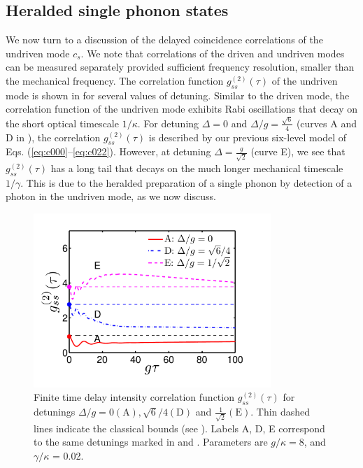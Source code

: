 



\subsection{Heralded single phonon states}

We now turn to a discussion of the delayed coincidence
correlations of the undriven mode $c_s$.
We note that correlations of the driven
and undriven modes can be measured separately
provided sufficient frequency resolution, smaller than
  the mechanical frequency.
The correlation function
$g^{(2)}_{ss}(\tau)$
of the undriven mode
is shown in  for several
values of detuning.
Similar to the driven mode, the
correlation function of the undriven mode
exhibits Rabi oscillations 
that decay on the short optical
timescale
$1/\kappa$.
For detuning $\Delta = 0$ and 
$\Delta/g = \frac{\sqrt{6}}{4}$
(curves A and D in ),
the correlation $g^{(2)}_{ss}(\tau)$
is described by
our previous six-level 
model of Eqs. (\ref{eq:c000}--\ref{eq:c022}).
However,  at detuning $\Delta = \frac{g}{\sqrt{2}}$
(curve E), we see that
$g^{(2)}_{ss}(\tau)$ has a long
tail that decays
on the much longer mechanical timescale $1/\gamma$.
This is due to the heralded preparation
of a single phonon by detection of a photon in the
undriven mode, as we now discuss.
\begin{figure}[htb] \centering
  \includegraphics[width=0.8\textwidth]{./figs_Komar2013/fig6.pdf}
  \caption[Autocorrelation of mode $s$]
  { 
  \label{fig:g2sstau}
  Finite time delay intensity correlation function $g^{(2)}_{ss}(\tau)$
  for detunings $\Delta/g = 0 \mathrm{ (A)}, \sqrt{6}/4 \mathrm{ (D)}$
  and
  $\frac{1}{\sqrt{2}} \mathrm{ (E)}$.
  Thin dashed lines indicate the classical bounds
  (see  ).
  Labels A, D, E correspond to the same detunings
  marked in 
  and
  .
  Parameters are $g/\kappa = 8$, and $\gamma/\kappa$ = 0.02.
  }
\end{figure}



